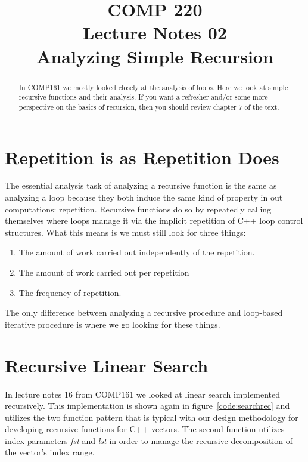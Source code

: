 \documentclass[nobib]{tufte-handout}
\title{COMP 220 \\ Lecture Notes 02 \\ Analyzing Simple Recursion}
\begin{document}
\maketitle

\begin{abstract}
In COMP161 we mostly looked closely at the analysis of loops. Here we look at simple recursive functions and their analysis.  If you want a refresher and/or some more perspective on the basics of recursion, then you should review chapter 7 of the text.
\end{abstract}

\section{Repetition is as Repetition Does}

The essential analysis task of analyzing a recursive function is the same as analyzing a loop because they both induce the same kind of property in out computations: repetition. Recursive functions do so by repeatedly calling themselves where loops manage it via the implicit repetition of C++ loop control structures. What this means is we must still look for three things:
\begin{enumerate}
  \item The amount of work carried out independently of the repetition.
  \item The amount of work carried out per repetition
  \item The frequency of repetition.
\end{enumerate}

The only difference between analyzing a recursive procedure and loop-based iterative procedure is where we go looking for these things.

\section{Recursive Linear Search}

In lecture notes 16 from COMP161 we looked at linear search implemented recursively. This implementation is shown again in figure~\ref{code:searchrec} and utilizes the two function pattern that is typical with our design methodology for developing recursive functions for C++ vectors. The second function utilizes index parameters \textit{fst} and \textit{lst} in order to manage the recursive decomposition of the vector's index range.
\end{document}
